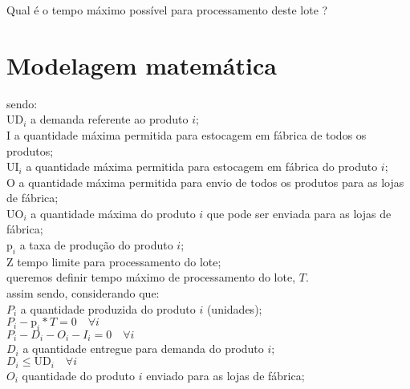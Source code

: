 \documentclass{book}
\begin{document}
Qual é o tempo máximo possível para processamento deste lote ? \\

\section{Modelagem matemática}

sendo: \\

$\textrm{UD}_i$ a demanda referente ao produto $i$; \\

$\textrm{I}$ a quantidade máxima permitida para estocagem em fábrica de todos os produtos; \\

$\textrm{UI}_i$ a quantidade máxima permitida para estocagem em fábrica do produto $i$; \\

$\textrm{O}$ a quantidade máxima permitida para envio de todos os produtos para as lojas de fábrica; \\

$\textrm{UO}_i$ a quantidade máxima do produto $i$ que pode ser enviada para as lojas de fábrica; \\ 

$\textrm{p}_i$ a taxa de produção do produto $i$; \\

$\textrm{Z}$ tempo limite para processamento do lote; \\

queremos definir tempo máximo de processamento do lote, $T$. \\

assim sendo, considerando que: \\

$P_i$ a quantidade produzida do produto $i$ (unidades); \\

$P_i - \textrm{p}_i * T  = 0 \quad \forall i$ \\

$P_i - D_i - O_i - I_i = 0 \quad \forall i$ \\

$D_i$ a quantidade entregue para demanda do produto $i$; \\

$D_i \leq \textrm{UD}_i \quad \forall i$ \\

$O_i$ quantidade do produto $i$ enviado para as lojas de fábrica; \\
\end{document}
